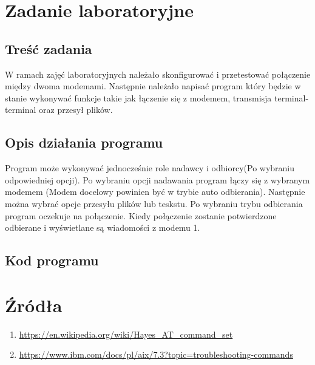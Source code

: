 \documentclass{article}
\begin{document}
    \section{Zadanie laboratoryjne}
    \raggedright
        \subsection{Treść zadania}
            W ramach zajęć laboratoryjnych należało skonfigurować i przetestować połączenie 
            między dwoma modemami. Następnie należało napisać program który będzie w stanie
            wykonywać funkcje takie jak łączenie się z modemem, transmisja terminal-terminal
            oraz przesył plików.
        \subsection{Opis działania programu}
            Program może wykonywać jednocześnie role nadawcy i odbiorcy(Po wybraniu odpowiedniej 
            opcji). Po wybraniu opcji nadawania program łączy się z wybranym modemem (Modem 
            docelowy powinien być w trybie auto odbierania). Następnie można wybrać opcje 
            przesyłu plików lub teskstu. Po wybraniu trybu odbierania program oczekuje na 
            połączenie. Kiedy połączenie zostanie potwierdzone odbierane i wyświetlane są
            wiadomości z modemu 1.
        \subsection{Kod programu}
    \section{Źródła}
        \begin{enumerate}[label=\arabic*.]
            \item \url{https://en.wikipedia.org/wiki/Hayes_AT_command_set}
            \item \url{https://www.ibm.com/docs/pl/aix/7.3?topic=troubleshooting-commands}
        \end{enumerate}
\end{document}
